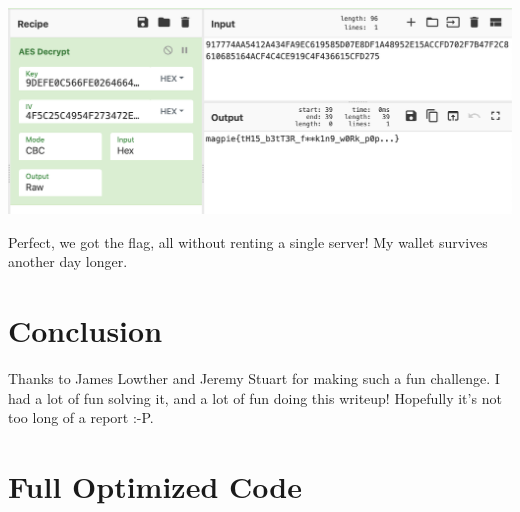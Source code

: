 \documentclass[11pt]{article}
\begin{document}
    \noindent\includegraphics[width=\textwidth]{images/cyberchef}

    Perfect, we got the flag, all without renting a single server! My wallet survives another day longer.

    \section{Conclusion}\label{sec:conclusion}

    Thanks to James Lowther and Jeremy Stuart for making such a fun challenge. I had a lot of fun solving it, and a lot of fun doing this writeup! Hopefully it's not too long of a report :-P\@.

    \pagebreak

    \appendix


    \section{Full Optimized Code}\label{sec:full-optimized-code}
\end{document}
